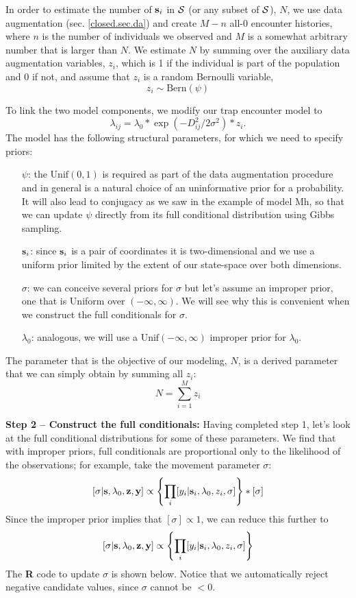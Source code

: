 In order to estimate the number of ${\bf s}_i$ in ${\cal S}$ (or any
subset of ${\cal S}$), $N$, we use data augmentation (sec. \ref{closed.sec.da}) and create $M-n$ all-0 encounter histories, where $n$ is the number of individuals we observed and $M$ is a somewhat arbitrary number that is larger than $N$. We estimate $N$ by summing over the auxiliary data augmentation variables, $z_i$, which is 1 if the individual is part of the population and 0 if not, and assume that $z_i$ is a random Bernoulli variable,
\[
z_{i} \sim \mbox{Bern}(\psi)
\]

To link the two model components, we modify our trap encounter model to
\[
\lambda_{ij} = \lambda_0 * \exp(-D_{ij}^2/2\sigma^2) * z_{i}.
\]
The model has the following structural parameters, for which we need to specify priors:
\begin{itemize}
\item[ $\psi$:] the $\mbox{Unif}(0,1)$ is required as part of the data augmentation procedure and in general is a natural choice of an uninformative prior for a probability. It will also lead to conjugacy as we saw in the example of model Mh, so that we can update $\psi$ directly from its full conditional distribution using Gibbs sampling.
\item[ ${\bf s}_{i}$:] since ${\bf s}_{i}$ is a pair of coordinates it is two-dimensional and we use a uniform prior limited by the extent of our state-space over both dimensions.
\item[ $\sigma$:] we can conceive several priors for $\sigma$ but let's assume an improper prior, one that is Uniform over $(-\infty, \infty)$. We will see why this is convenient when we construct the full conditionals for $\sigma$.
\item[ $\lambda_{0}$:] analogous, we will use a $\mbox{Unif}(-\infty, \infty)$ improper prior for $\lambda_{0}$.
\end{itemize}
The parameter that is the objective of our modeling, $N$, is a derived parameter that we can simply obtain by summing all $z_i$:
\[
N = \sum_{i=1}^{M} z_{i}
\]

{\bf Step 2 -- Construct the full conditionals:}
Having completed step 1, let's look at the full conditional distributions for some of these parameters.
We find that with improper priors, full conditionals are proportional only to the likelihood of the observations; for example, take the movement parameter $\sigma$:
\[
[\sigma|{\bf s}, \lambda_{0}, {\bf z}, {\bf y}] \propto \left\{ \prod_{i} [y_{i}| {\bf
    s}_{i}, \lambda_{0}, z_{i}, \sigma] \right\} * [\sigma]
\]
Since the improper prior implies that $[\sigma] \propto 1$, we can reduce this further to
\[
[\sigma|{\bf s}, \lambda_{0}, {\bf z}, {\bf y}] \propto \left\{
  \prod_{i} [y_{i}| {\bf s}_{i}, \lambda_{0}, z_{i}, \sigma] \right\}
\]
The {\bf R} code to update $\sigma$ is shown below.
Notice that we automatically reject negative candidate values, since $\sigma$ cannot be $<0$.  

